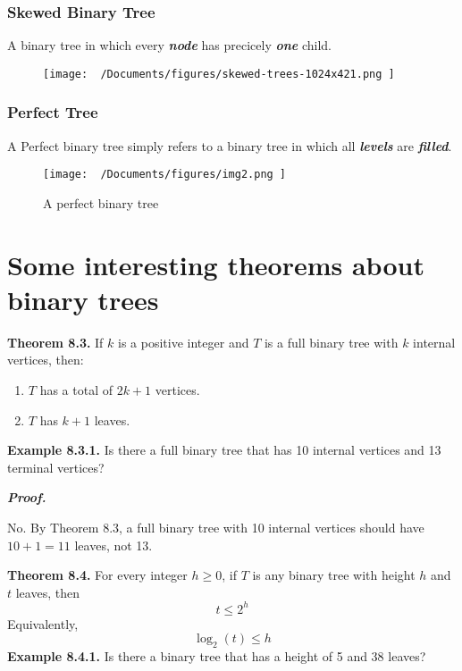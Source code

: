\documentclass{report}
\begin{document}
\subsubsection{Skewed Binary Tree}
A binary tree in which every \textit{\textbf{node}} has precicely \textit{\textbf{one}} child.
\begin{figure}[ht]
\centering
\texttt{[image:  ~/Documents/figures/skewed-trees-1024x421.png ]}
\end{figure}
\newpage
\subsubsection{Perfect Tree}
A Perfect binary tree simply refers to a binary tree in which all \textit{\textbf{levels}} are \textit{\textbf{filled}}.
\begin{figure}[ht]
\centering
\texttt{[image:  ~/Documents/figures/img2.png ]}
\caption{A perfect binary tree}
\end{figure}
\section*{Some interesting theorems about binary trees}

\textbf{Theorem 8.3.} If \( k \) is a positive integer and \( T \) is a full binary tree with \( k \) internal vertices, then:
\begin{enumerate}
    \item \( T \) has a total of \( 2k+1 \) vertices.
    \item \( T \) has \( k+1 \) leaves.
\end{enumerate}
\bigbreak \noindent
\noindent \textbf{Example 8.3.1.} Is there a full binary tree that has 10 internal vertices and 13 terminal vertices? \vspace{2mm}

\noindent \textbf{\textit{Proof.}} \vspace{2mm}

 No. By Theorem 8.3, a full binary tree with 10 internal vertices should have \( 10 + 1 = 11 \) leaves, not 13.

\bigbreak \noindent \bigbreak \noindent
\textbf{Theorem 8.4.} For every integer \( h \geq 0 \), if \( T \) is any binary tree with height \( h \) and \( t \) leaves, then
\[
t \leq 2^{h}
\]
Equivalently, 
\[
\log_2(t) \leq h
\]
\bigbreak \noindent
\textbf{Example 8.4.1.} Is there a binary tree that has a height of 5 and 38 leaves? \vspace{2mm}
\end{document}
